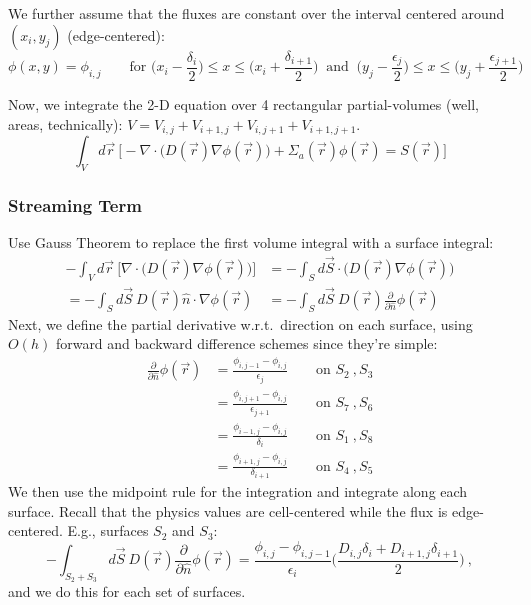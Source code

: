 \documentclass[12pt]{article}
\begin{document}
We further assume that the fluxes are constant over the interval centered around $(x_i, y_j)$ (edge-centered):
%
\[\phi(x,y) = \phi_{i,j} \qquad \text{for } \bigl(x_i - \frac{\delta_i}{2}\bigr) \leq x \leq \bigl(x_i + \frac{\delta_{i+1}}{2}\bigr) \:\text{ and }\:\bigl(y_j - \frac{\epsilon_j}{2}\bigr) \leq x \leq \bigl(y_j + \frac{\epsilon_{j+1}}{2}\bigr) \]

Now, we integrate the 2-D equation over 4 rectangular partial-volumes (well, areas, technically): $V = V_{i,j} + V_{i+1,j} + V_{i,j+1} + V_{i+1,j+1}$.
%
\[\int_V d\vec{r}\:\bigl[-\nabla \cdot \bigl(D(\vec{r})\nabla \phi(\vec{r})\bigr) +\Sigma_a(\vec{r}) \phi(\vec{r}) = S(\vec{r}) \bigr]\]


\subsubsection{Streaming Term}
Use Gauss Theorem to replace the first volume integral with a surface integral:
%
\begin{align}
-\int_V d\vec{r}\:\bigl[\nabla \cdot \bigl(D(\vec{r})\nabla \phi(\vec{r})\bigr)\bigr] &= -\int_S d\vec{S} \cdot\bigl(D(\vec{r})\nabla \phi(\vec{r})\bigr) \nonumber \\
%
= -\int_S d\vec{S}\: D(\vec{r})\hat{n} \cdot \nabla \phi(\vec{r}) &= -\int_S d\vec{S} \:D(\vec{r})\frac{\partial}{\partial \hat{n}}\phi(\vec{r}) \nonumber
\end{align}
%
Next, we define the partial derivative w.r.t.\ direction on each surface, using $O(h)$ forward and backward difference schemes since they're simple:
\begin{align}
\frac{\partial}{\partial \hat{n}}\phi(\vec{r}) &= \frac{\phi_{i,j-1} - \phi_{i,j}}{\epsilon_j} \qquad \text{on } S_2 \:, S_3 \nonumber \\
%
&= \frac{\phi_{i,j+1} - \phi_{i,j}}{\epsilon_{j+1}} \qquad \text{on } S_7 \:, S_6 \nonumber \\
%
&= \frac{\phi_{i-1,j} - \phi_{i,j}}{\delta_{i}} \qquad \text{on } S_1 \:, S_8 \nonumber \\
%
&= \frac{\phi_{i+1,j} - \phi_{i,j}}{\delta_{i+1}} \qquad \text{on } S_4 \:, S_5 \nonumber 
\end{align}
%
We then use the midpoint rule for the integration and integrate along each surface. Recall that the physics values are cell-centered while the flux is edge-centered. E.g., surfaces $S_2$ and $S_3$:
%
\[-\int_{S_2+S_3} d\vec{S} \:D(\vec{r})\frac{\partial}{\partial \hat{n}}\phi(\vec{r}) = \boxed{\frac{\phi_{i,j} - \phi_{i,j-1}}{\epsilon_{i}} \biggl(\frac{D_{i,j} \delta_{i} + D_{i+1,j} \delta_{i+1}}{2}\biggr)}\:,\]
%
and we do this for each set of surfaces. 
\end{document}
